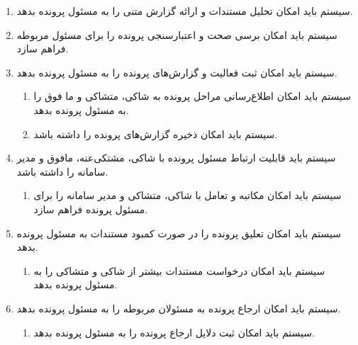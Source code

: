 \documentclass[12pt,a4paper,oneside]{article}
\begin{document}
\begin{itemize}
\begin{enumerate}
        \item 
        سیستم باید امکان تحلیل مستندات و ارائه گزارش متنی را به مسئول پرونده بدهد.

        \item 
        سیستم باید امکان برسی صحت و اعتبارسنجی پرونده را برای مسئول مربوطه فراهم سازد.

        \item 
        سیستم باید امکان ثبت فعالیت و گزارش‌های پرونده را به مسئول پرونده بدهد.
        \begin{enumerate}
            \renewcommand{\labelenumii}{\textbf{.R\arabic{enumi}.\arabic{enumii}}}
            \item 
            سیستم باید امکان اطلاع‌رسانی مراحل پرونده به شاکی، متشاکی و ما فوق را به مسئول پرونده بدهد.
            \item 
            سیستم باید امکان ذخیره گزارش‌های پرونده را داشته باشد.
        \end{enumerate}

        \item 
        سیستم باید قابلیت ارتباط مسئول پرونده با شاکی، مشتکی‌عنه، مافوق و مدیر سامانه را داشته باشد.
        \begin{enumerate}
            \renewcommand{\labelenumii}{\textbf{.R\arabic{enumi}.\arabic{enumii}}}
            \item 
            سیستم باید امکان مکاتبه و تعامل با شاکی، متشاکی و مدیر سامانه را برای مسئول پرونده فراهم سازد.
        \end{enumerate}

        \item 
        سیستم باید امکان تعلیق پرونده را در صورت کمبود مستندات به مسئول پرونده بدهد.
        \begin{enumerate}
            \renewcommand{\labelenumii}{\textbf{.R\arabic{enumi}.\arabic{enumii}}}
            \item 
            سیستم باید امکان درخواست مستندات بیشتر از شاکی و متشاکی را به مسئول پرونده بدهد.
        \end{enumerate}

        \item 
        سیستم باید امکان ارجاع پرونده به مسئولان مربوطه را به مسئول پرونده بدهد.
        \begin{enumerate}
            \renewcommand{\labelenumii}{\textbf{.R\arabic{enumi}.\arabic{enumii}}}
            \item 
            سیستم باید امکان ثبت دلایل ارجاع پرونده را به مسئول پرونده بدهد.
        \end{enumerate}


\end{enumerate}
\end{itemize}
\end{document}
